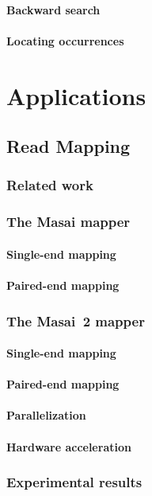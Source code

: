 \subsection{Backward search}
\subsection{Locating occurrences}


\part{Applications}

\chapter{Read Mapping}
\section{Related work}
\section{The Masai mapper}
\subsection{Single-end mapping}
\subsection{Paired-end mapping}
\section{The Masai~2 mapper}
\subsection{Single-end mapping}
\subsection{Paired-end mapping}
\subsection{Parallelization}
\subsection{Hardware acceleration}
\section{Experimental results}
